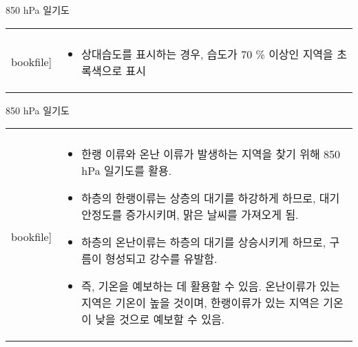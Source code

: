 \begin{frame}[t]{850 hPa 일기도}
	\begin{tabular}{ll}
		\begin{minipage}[t]{0.475\textwidth}\scriptsize
			\begin{figure}[t]
				\texttt{[image: \\bookfile]}
			\end{figure}
			
		\end{minipage}	
		&
		\begin{minipage}[t]{0.475\textwidth} \scriptsize	
			\begin{itemize}\scriptsize	
				\item 상대습도를 표시하는 경우, 습도가 70 \% 이상인 지역을 초록색으로 표시		

			\end{itemize}

		\end{minipage}
	\end{tabular}
\end{frame}


\begin{frame}[t]{850 hPa 일기도}
	\begin{tabular}{ll}
		\begin{minipage}[t]{0.475\textwidth}\scriptsize
			\begin{figure}[t]
				\texttt{[image: \\bookfile]}
			\end{figure}
		\end{minipage}	
		&
		\begin{minipage}[t]{0.475\textwidth} \scriptsize	
			

			\begin{itemize}\scriptsize	
				\item 한랭 이류와 온난 이류가 발생하는 지역을 찾기 위해 850 hPa 일기도를 활용.
				\item 하층의 한랭이류는 상층의 대기를 하강하게 하므로, 대기 안정도를 증가시키며, 맑은 날씨를 가져오게 됨.
				\item 하층의 온난이류는 하층의 대기를 상승시키게 하므로, 구름이 형성되고 강수를 유발함.
				\item 즉, 기온을 예보하는 데 활용할 수 있음. 온난이류가 있는 지역은 기온이 높을 것이며, 한랭이류가 있는 지역은 기온이 낮을 것으로 예보할 수 있음. 
				
			\end{itemize}

		\end{minipage}
	\end{tabular}
\end{frame}


